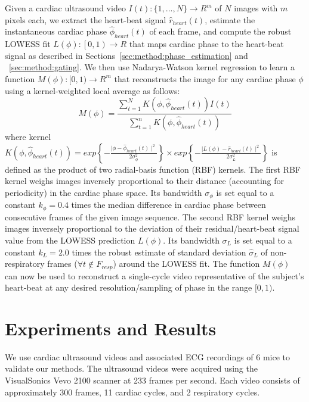 \documentclass[runningheads,a4paper]{llncs}
\begin{document}
Given a cardiac ultrasound video $I(t) : \{1, ..., N\} \to R^m$ of $N$ images with $m$ pixels each, we extract the heart-beat signal $\hat{r}_{heart}(t)$, estimate the instantaneous cardiac phase $\hat{\phi}_{heart}(t)$ of each frame, and compute the robust LOWESS fit $L(\phi) : \left [  0, 1\right ) \to R$ that maps cardiac phase to the heart-beat signal as described in Sections~\ref{sec:method:phase_estimation} and ~\ref{sec:method:gating}. We then use Nadarya-Watson kernel regression \cite{Bishop2006} to learn a function $M(\phi): [0, 1) \to R^m $ that reconstructs the image for any cardiac phase $\phi$ using a kernel-weighted local average as follows:
\begin{equation}
M(\phi) = \frac{\sum_{t = 1}^{N} K \left( \phi, \hat{\phi}_{heart}(t) \right) I(t)}{\sum_{t = 1}^{n} K \left( \phi, \hat{\phi}_{heart}(t) \right)} 
\end{equation}
where kernel $K\left( \phi, \hat{\phi}_{heart}(t) \right) = exp\left \{ -\frac{ \mid \phi - \hat{\phi}_{heart}(t) \mid^2}{2  \sigma^2_\phi} \right \} \times exp\left \{ -\frac{ \mid L(\phi) - \hat{r}_{heart}(t) \mid^2}{2  \sigma^2_{L}} \right \}$ is defined as the product of two radial-basis function (RBF) kernels. The first RBF kernel  weighs images inversely proportional to their distance (accounting for periodicity) in the cardiac phase space. Its bandwidth $\sigma_\phi$ is set equal to a constant $k_\phi = 0.4$ times the median difference in cardiac phase between consecutive frames of the given image sequence. The second RBF kernel weighs images inversely proportional to the deviation of their residual/heart-beat signal value from the LOWESS prediction $L(\phi)$. Its bandwidth $\sigma_{L}$ is set equal to a constant $k_L = 2.0$ times the robust estimate of standard deviation $\hat{\sigma}_{L}$ of non-respiratory frames ($\forall t \notin F_{resp}$) around the LOWESS fit. The function $M(\phi)$ can now be used to reconstruct a single-cycle video representative of the subject's heart-beat at any desired resolution/sampling of phase in the range $[0, 1)$. 
%
\vspace{-0.3cm}
\section{Experiments and Results}
\label{sec:results}
\vspace{-0.3cm}
%
We use cardiac ultrasound videos and associated ECG recordings of 6 mice to validate our methods. The ultrasound videos were acquired using the VisualSonics Vevo 2100 scanner at 233 frames per second. Each video consists of approximately 300 frames, 11 cardiac cycles, and 2 respiratory cycles.
\end{document}
